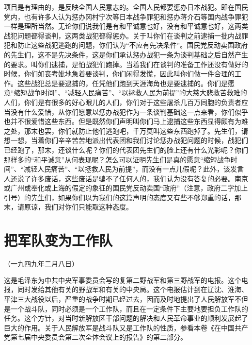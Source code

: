 \documentclass[UTF-8, a5paper, 12pt]{ctexart}
\begin{document}
项目是有理由的，是反映全国人民意志的。全国人民都要惩办日本战犯。即在国民党内，也有许多人认为惩办冈村宁次等日本战争罪犯和惩办蒋介石等国内战争罪犯一样是理所当然。无论你们说我们是有和平诚意也好，没有和平诚意也好，这两类战犯问题都得谈判，这两类战犯都得惩办。关于叫你们在谈判之前逮捕一批内战罪犯和防止这些战犯逃跑的问题，你们认为“不应有先决条件”。国民党反动卖国政府的先生们，这不是先决条件，这是你们承认惩办战犯一条为谈判基础之后自然产生的要求。叫你们逮捕，是怕战犯们跑掉。当着我们在谈判的准备工作还没有做好的时候，你们如丧考妣地急着要谈判，你们闲得发慌，因此叫你们做一件合理的工作。这些战犯总是要逮捕的，任凭他们跑到天涯海角也是要逮捕的。你们是愿意“缩短战争时间”、“减轻人民痛苦”、“以拯救人民为前提”的大慈大悲救苦救难的人们，你们是有很多的好心眼儿的人们，你们对于这些屠杀几百万同胞的负责者应当没有什么爱惜，从你们愿意以惩办战犯作为一条谈判基础这一点来看，你们似乎也并不很爱惜这些东西。但是既然你们声明叫你们马上逮捕这些东西显得颇有为难之处，那末也罢，你们就防止他们逃跑吧，千万莫叫这些东西跑掉了。先生们，请想一想，当着你们辛辛苦苦地派出代表团和我们讨论惩办战犯问题的时候，战犯们已经跑了，那末，还谈什么呢？你们的代表团先生们的脸上还有什么光彩呢？你们那样多的“和平诚意”从何表现呢？怎么可以证明先生们是真的愿意“缩短战争时间”、“减轻人民痛苦”、“以拯救人民为前提”，而没有一点儿假呢？此外，该发言人还说了许多废话，这些废话是骗不了任何人的，我们认为没有答复的必要。南京或广州或奉化或上海的假定的象征的国民党反动卖国“政府”（注意，政府二字加上引号）的先生们，如果你们以为我们的这篇声明的态度又有些不够郑重的话，那末，请原谅，我们对你们只能取这种态度。
\section{把军队变为工作队}

（一九四九年二月八日）

这是毛泽东为中共中央军事委员会写的复第二野战军和第三野战军的电报。这个电报，同时发给其他有关的野战军和有关的中央局。这个电报估计到在辽沈、淮海、平津三大战役以后，严重的战争时期已经过去，因而及时地提出了人民解放军不但是一个战斗队，同时必须是一个工作队，而且在一定条件下主要地要担负工作队的任务。这个方针，对当时新解放区干部问题的解决和人民革命事业的顺利发展起了巨大的作用。关于人民解放军是战斗队又是工作队的性质，参看本卷《在中国共产党第七届中央委员会第二次全体会议上的报告》的第二部分。
\end{document}
